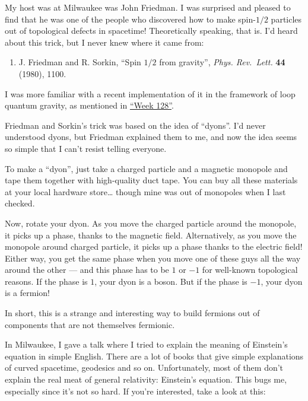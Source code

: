 \documentclass{article}
\def\tightlist{}
\renewcommand{\texttt}[1]{%
  \begingroup
  \ttfamily
  \begingroup\lccode`~=`/\lowercase{\endgroup\def~}{/\discretionary{}{}{}}%
  \begingroup\lccode`~=`[\lowercase{\endgroup\def~}{[\discretionary{}{}{}}%
  \begingroup\lccode`~=`.\lowercase{\endgroup\def~}{.\discretionary{}{}{}}%
  \catcode`/=\active\catcode`[=\active\catcode`.=\active
  \scantokens{#1\noexpand}%
  \endgroup
}
\begin{document}
My host was at Milwaukee was John Friedman. I was surprised and pleased
to find that he was one of the people who discovered how to make
spin-\(1/2\) particles out of topological defects in spacetime!
Theoretically speaking, that is. I'd heard about this trick, but I never
knew where it came from:

\begin{enumerate}
\def\labelenumi{\arabic{enumi})}
\setcounter{enumi}{2}
\tightlist
\item
  J. Friedman and R. Sorkin, ``Spin \(1/2\) from gravity'', \emph{Phys.
  Rev.~Lett.} \textbf{44} (1980), 1100.
\end{enumerate}

I was more familiar with a recent implementation of it in the framework
of loop quantum gravity, as mentioned in
\protect\hyperlink{week128}{``Week 128''}.

Friedman and Sorkin's trick was based on the idea of ``dyons''. I'd
never understood dyons, but Friedman explained them to me, and now the
idea seems so simple that I can't resist telling everyone.

To make a ``dyon'', just take a charged particle and a magnetic monopole
and tape them together with high-quality duct tape. You can buy all
these materials at your local hardware store\ldots{} though mine was out
of monopoles when I last checked.

Now, rotate your dyon. As you move the charged particle around the
monopole, it picks up a phase, thanks to the magnetic field.
Alternatively, as you move the monopole around charged particle, it
picks up a phase thanks to the electric field! Either way, you get the
same phase when you move one of these guys all the way around the other
--- and this phase has to be \(1\) or \(-1\) for well-known topological
reasons. If the phase is \(1\), your dyon is a boson. But if the phase
is \(-1\), your dyon is a fermion!

In short, this is a strange and interesting way to build fermions out of
components that are not themselves fermionic.

In Milwaukee, I gave a talk where I tried to explain the meaning of
Einstein's equation in simple English. There are a lot of books that
give simple explanations of curved spacetime, geodesics and so on.
Unfortunately, most of them don't explain the real meat of general
relativity: Einstein's equation. This bugs me, especially since it's not
so hard. If you're interested, take a look at this:

\end{document}
